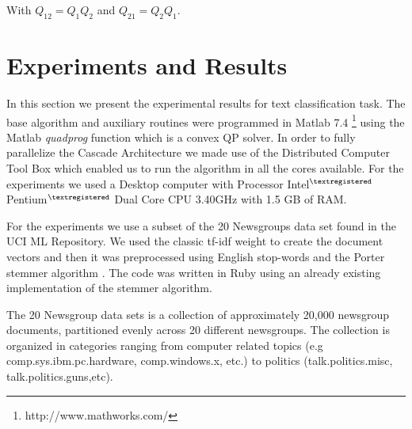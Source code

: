 With $Q_{12}=Q_{1}Q_{2}$ and $Q_{21}=Q_{2}Q_{1}$. 


\section{Experiments and Results}

In this section we present the experimental results for text classification
task. The base algorithm and auxiliary routines were programmed in
Matlab 7.4%
\footnote{http://www.mathworks.com/%
} using the Matlab \emph{quadprog} function which is a convex QP solver.
In order to fully parallelize the Cascade Architecture we made use
of the Distributed Computer Tool Box which enabled us to run the algorithm
in all the cores available. For the experiments we used a Desktop
computer with Processor Intel$^{\textregistered}$ Pentium$^{\textregistered}$
Dual Core CPU 3.40GHz with 1.5 GB of RAM.

For the experiments we use a subset of the 20 Newsgroups \cite{20news}
data set found in the UCI ML Repository\cite{Asuncion+Newman:2007}.
We used the classic tf-idf weight to create the document vectors
\cite{361220,866292} and then it was preprocessed using English stop-words
and the Porter stemmer algorithm \cite{Porter80}. The code was written
in Ruby using an already existing implementation of the stemmer algorithm. 

The 20 Newsgroup data sets is a collection of approximately
20,000 newsgroup documents, partitioned evenly across 20 different
newsgroups. The collection is organized in categories ranging from computer
related topics (e.g comp.sys.ibm.pc.hardware, comp.windows.x, etc.) to
politics (talk.politics.misc,  talk.politics.guns,etc).

